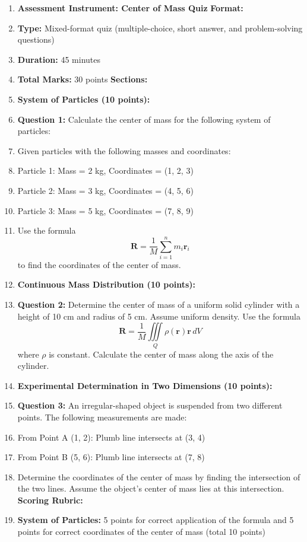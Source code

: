 \begin{enumerate}
    \item \textbf{Assessment Instrument: Center of Mass Quiz} \textbf{Format:}
    \item \textbf{Type:} Mixed-format quiz (multiple-choice, short answer, and problem-solving questions)
    \item \textbf{Duration:} 45 minutes
    \item \textbf{Total Marks:} 30 points \textbf{Sections:}
    \item \textbf{System of Particles (10 points):}
    \item \textbf{Question 1:} Calculate the center of mass for the following system of particles:
    \item Given particles with the following masses and coordinates:
    \item Particle 1: Mass = 2 kg, Coordinates = (1, 2, 3)
    \item Particle 2: Mass = 3 kg, Coordinates = (4, 5, 6)
    \item Particle 3: Mass = 5 kg, Coordinates = (7, 8, 9)
    \item Use the formula $$\mathbf{R} = \frac{1}{M} \sum_{i=1}^n m_i \mathbf{r}_i$$ to find the coordinates of the center of mass.
    \item \textbf{Continuous Mass Distribution (10 points):}
    \item \textbf{Question 2:} Determine the center of mass of a uniform solid cylinder with a height of 10 cm and radius of 5 cm. Assume uniform density. Use the formula $$\mathbf{R} = \frac{1}{M} \iiint\limits_{Q} \rho(\mathbf{r}) \mathbf{r} \, dV$$ where \( \rho \) is constant. Calculate the center of mass along the axis of the cylinder.
    \item \textbf{Experimental Determination in Two Dimensions (10 points):}
    \item \textbf{Question 3:} An irregular-shaped object is suspended from two different points. The following measurements are made:
    \item From Point A (1, 2): Plumb line intersects at (3, 4)
    \item From Point B (5, 6): Plumb line intersects at (7, 8)
    \item Determine the coordinates of the center of mass by finding the intersection of the two lines. Assume the object’s center of mass lies at this intersection. \textbf{Scoring Rubric:}
    \item \textbf{System of Particles:} 5 points for correct application of the formula and 5 points for correct coordinates of the center of mass (total 10 points)

\end{enumerate}
